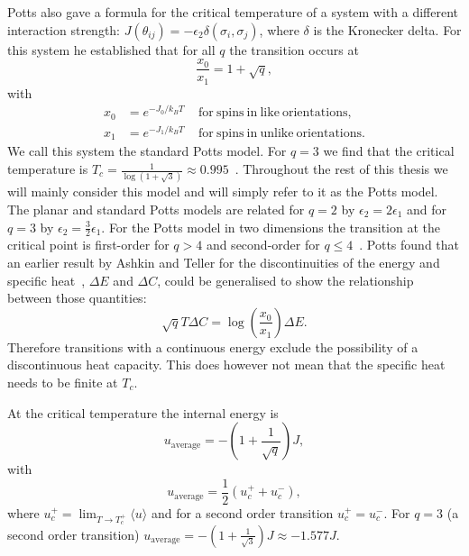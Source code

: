 \documentclass[11pt, a4paper]{report} %
\begin{document}
Potts also gave a formula for the critical temperature of a system with a different interaction strength: \(J(\theta_{ij}) = -\epsilon_2 \delta(\sigma_i, \sigma_j)\), where \(\delta\) is the Kronecker delta.
For this system he established that for all \(q\) the transition occurs at~\cite{potts:1952}
\begin{equation}
	\frac{x_0}{x_1} = 1 + \sqrt{q},
\end{equation}
with
\begin{align}
	x_0 &= e^{-J_0 / k_B T} \mathrm{\ \ \ \ \ for\ spins\ in\ like\ orientations,}\\
	x_1 & = e^{-J_1 / k_B T} \mathrm{\ \ \ \ \ for\ spins\ in\ unlike\ orientations}.
\end{align}
We call this system the standard Potts model.
For \(q=3\) we find that the critical temperature is \(T_c=\frac{1}{\log(1+\sqrt{3})} \approx 0.995\)~\cite{fan:2007}.
Throughout the rest of this thesis we will mainly consider this model and will simply refer to it as the Potts model.
The planar and standard Potts models are related for \(q = 2\) by \(\epsilon_2 = 2 \epsilon_1\) and for \(q=3\) by \(\epsilon_2 = \frac{3}{2} \epsilon_1\).
For the Potts model in two dimensions the transition at the critical point is first-order for \(q > 4\) and second-order for \(q \leq 4\)~\cite{wu:1982,baxter:1973}.
Potts found that an earlier result by Ashkin and Teller for the discontinuities of the energy and specific heat~\cite{ashkin:1943}, \(\Delta E\) and \(\Delta C\), could be generalised to show the relationship between those quantities:
\begin{equation}
	\sqrt{q}T \Delta C = \log(\frac{x_0}{x_1}) \Delta E.
\end{equation}
Therefore transitions with a continuous energy exclude the possibility of a discontinuous heat capacity.
This does however not mean that the specific heat needs to be finite at \(T_c\).


At the critical temperature the internal energy is~\cite{baxter:1989,binder:1981a}
\begin{equation}
	u_{\mathrm{average}} = -\left(1+\frac{1}{\sqrt{q}}\right)J,
\end{equation}
with
\begin{equation}
	u_{\mathrm{average}} = \frac{1}{2} (u_c^+ + u_c^-),
\end{equation}
where \(u_c^+ = \lim_{T \to T_c^+} \langle u \rangle\) and for a second order transition \(u_c^+ = u_c^-\).
For \(q=3\) (a second order transition) \(u_{\mathrm{average}} = -(1+\frac{1}{\sqrt{3}})J \approx - 1.577 J\).
\end{document}
